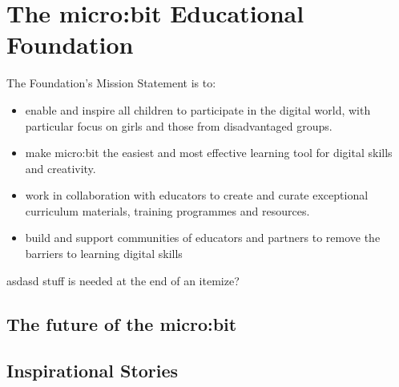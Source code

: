 \section{The micro:bit Educational Foundation}
\label{sec:mef}

The Foundation's Mission Statement is to:
\begin{itemize}
\item  enable and inspire all children to participate in the digital world,
with particular focus on girls and those from disadvantaged groups.
\item make micro:bit the easiest and most effective learning tool for digital skills and creativity.
\item work in collaboration with educators to create and curate exceptional
curriculum materials, training programmes and resources.
\item build and support communities of educators and partners
to remove the barriers to learning digital skills
\end{itemize}

asdasd stuff is needed at the end of an itemize?

\subsection{The future of the micro:bit}


\subsection{Inspirational Stories}




